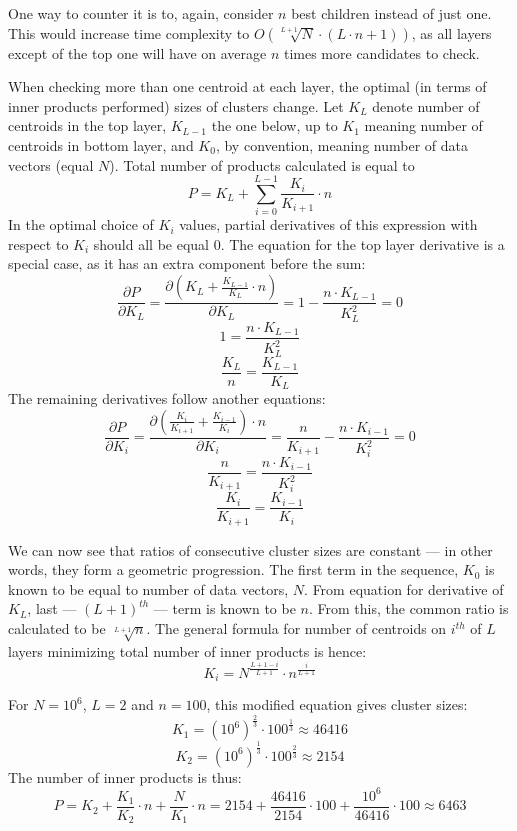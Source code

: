One way to counter it is to, again, consider $n$ best children instead of
just one. This would increase time complexity to 
$ O(\sqrt[L+1]{N} \cdot (L \cdot n + 1)) $, as all layers except of the top one
will have on average $n$ times more candidates to check.

When checking more than one centroid at each layer, the optimal (in terms
of inner products performed) sizes of clusters change. Let $ K_L $ denote
number of centroids in the top layer, $ K_{L-1} $ the one below, up to
$ K_1 $ meaning number of centroids in bottom layer, and $ K_0 $, by 
convention, meaning number of data vectors (equal $N$). Total number of
products calculated is equal to 
$$ P = K_L + \sum_{i=0}^{L-1} \frac{K_i}{K_{i+1}} \cdot n $$
In the optimal choice of $K_i$ values, partial derivatives of this expression
with respect to $K_i$ should all be equal 0. The equation for the top layer 
derivative is a special case, as it has an extra component before the sum:
$$ 
\frac{\partial P}{\partial K_L} = 
\frac{\partial (K_L + \frac{K_{L-1}}{K_L} \cdot n)}{\partial K_L} =
1 -\frac{n \cdot K_{L-1}}{K_L^2} = 
0
$$
$$
1 = \frac{n \cdot K_{L-1}}{K_L^2}
$$
$$
\frac{K_L}{n} = \frac{K_{L-1}}{K_L}
$$
The remaining derivatives follow another equations:
$$
\frac{\partial P}{\partial K_i} =
\frac{\partial (\frac{K_i}{K_{i+1}} + \frac{K_{i-1}}{K_i}) \cdot n}{\partial K_i} =
\frac{n}{K_{i+1}} - \frac{n \cdot K_{i-1}}{K_i^2} = 0
$$
$$
\frac{n}{K_{i+1}} = \frac{n \cdot K_{i-1}}{K_i^2}
$$
$$
\frac{K_i}{K_{i+1}} = \frac{K_{i-1}}{K_i}
$$

We can now see that ratios of consecutive cluster sizes are constant --- in other
words, they form a geometric progression. The first term in the sequence,
$K_0$ is known to be equal to number of data vectors, $N$. From equation
for derivative of $K_L$, last --- $(L+1)^{th}$ --- term is known to be $n$. From this,
the common ratio is calculated to be $\sqrt[L+1]{n}$. The general formula
for number of centroids on $i^{th}$ of $L$ layers minimizing total number of
inner products is hence:
$$
K_i = N^{\frac{L+1-i}{L+1}} \cdot n^\frac{i}{L+1}
$$

For $N = 10^6$, $L = 2$ and $n = 100$, this modified equation gives cluster sizes:
$$ K_1 = (10^6)^{\frac{2}{3}} \cdot 100^\frac{1}{3} \approx 46416 $$
$$ K_2 = (10^6)^{\frac{1}{3}} \cdot 100^\frac{2}{3} \approx 2154 $$
The number of inner products is thus:
$$ 
P = K_2 + \frac{K_1}{K_2} \cdot n + \frac{N}{K_1} \cdot n =
2154 + \frac{46416}{2154} \cdot 100 + \frac{10^6}{46416} \cdot 100 \approx
6463
$$

